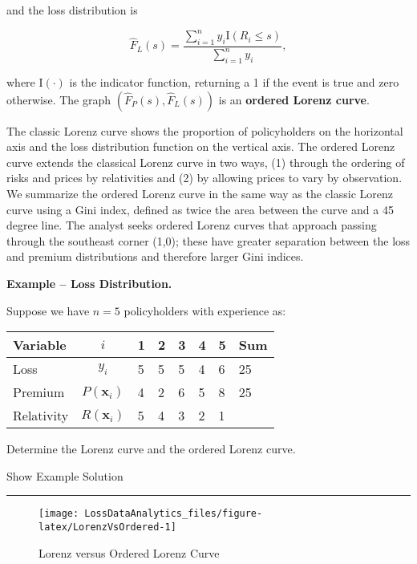 \documentclass[]{book}
\theoremstyle{definition}
\theoremstyle{definition}
\theoremstyle{definition}
\theoremstyle{remark}
\begin{document}
and the loss distribution is

\begin{equation}
\hat{F}_{L}(s) =  \frac{ \sum_{i=1}^n y_i \mathrm{I}(R_i
\leq s) }{\sum_{i=1}^n y_i} ,\label{eq:EmpLossDF}
\end{equation}

where \(\mathrm{I}(\cdot)\) is the indicator function, returning a 1 if
the event is true and zero otherwise. The graph
\(\left(\hat{F}_P(s),\hat{F}_{L}(s) \right)\) is an \textbf{ordered
Lorenz curve}.

The classic Lorenz curve shows the proportion of policyholders on the
horizontal axis and the loss distribution function on the vertical axis.
The ordered Lorenz curve extends the classical Lorenz curve in two ways,
(1) through the ordering of risks and prices by relativities and (2) by
allowing prices to vary by observation. We summarize the ordered Lorenz
curve in the same way as the classic Lorenz curve using a Gini index,
defined as twice the area between the curve and a 45 degree line. The
analyst seeks ordered Lorenz curves that approach passing through the
southeast corner (1,0); these have greater separation between the loss
and premium distributions and therefore larger Gini indices.

\textbf{Example -- Loss Distribution.}

Suppose we have \(n=5\) policyholders with experience as:

\begin{longtable}[]{@{}lcllllll@{}}
\toprule
Variable & \(i\) & 1 & 2 & 3 & 4 & 5 & Sum\tabularnewline
\midrule
\endhead
Loss & \(y_i\) & 5 & 5 & 5 & 4 & 6 & 25\tabularnewline
Premium & \(P(\mathbf{x}_i)\) & 4 & 2 & 6 & 5 & 8 & 25\tabularnewline
Relativity & \(R(\mathbf{x}_i)\) & 5 & 4 & 3 & 2 & 1 &\tabularnewline
\bottomrule
\end{longtable}

Determine the Lorenz curve and the ordered Lorenz curve.

Show Example Solution

\hypertarget{toggleLorenz}{}
\begin{center}\rule{0.5\linewidth}{\linethickness}\end{center}

\begin{figure}

{\centering \texttt{[image: LossDataAnalytics\_files/figure-latex/LorenzVsOrdered-1]} 

}

\caption{Lorenz versus Ordered Lorenz Curve}\label{fig:LorenzVsOrdered}
\end{figure}
\end{document}
